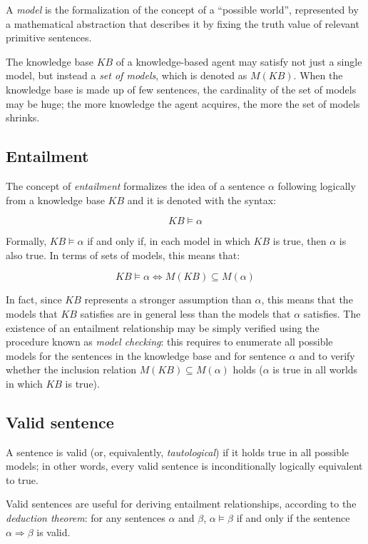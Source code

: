 \documentclass[letterpaper,headings=standardclasses]{scrartcl}
\begin{document}
A \emph{model} is the formalization of the concept of a ``possible world'', represented by a mathematical abstraction that describes it by fixing the truth value of relevant primitive sentences.

The knowledge base $KB$ of a knowledge-based agent may satisfy not just a single model, but instead a \emph{set of models}, which is denoted as $M(KB)$. When the knowledge base is made up of few sentences, the cardinality of the set of models may be huge; the more knowledge the agent acquires, the more the set of models shrinks.

\subsection{Entailment}

The concept of \emph{entailment} formalizes the idea of a sentence $\alpha$ following logically from a knowledge base $KB$ and it is denoted with the syntax:

$$ KB \models \alpha $$

Formally, $ KB \models \alpha $ if and only if, in each model in which $KB$ is true, then $\alpha$ is also true. In terms of sets of models, this means that:

$$ KB \models \alpha \Leftrightarrow M(KB) \subseteq M(\alpha) $$

In fact, since $KB$ represents a stronger assumption than $\alpha$, this means that the models that $KB$ satisfies are in general less than the models that $\alpha$ satisfies. The existence of an entailment relationship may be simply verified using the procedure known as \emph{model checking}: this requires to enumerate all possible models for the sentences in the knowledge base and for sentence $\alpha$ and to verify whether the inclusion relation $ M(KB) \subseteq M(\alpha) $ holds ($\alpha$ is true in all worlds in which $KB$ is true).

\subsection{Valid sentence}

A sentence is valid (or, equivalently, \emph{tautological}) if it holds true in all possible models; in other words, every valid sentence is inconditionally logically equivalent to true.

Valid sentences are useful for deriving entailment relationships, according to the \emph{deduction theorem}: for any sentences $\alpha$ and $\beta$, $\alpha \models \beta$ if and only if the sentence $\alpha \Rightarrow \beta$ is valid.
\end{document}
